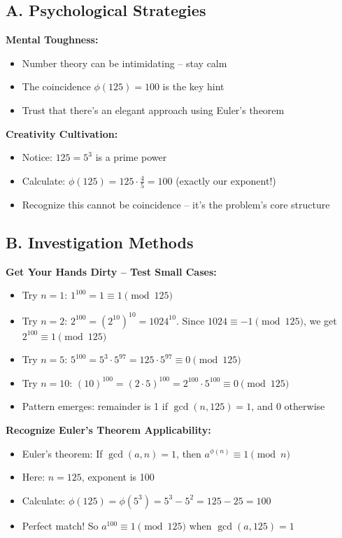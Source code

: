 \documentclass[12pt]{article}
\begin{document}
\begin{strategicbox}
\subsection*{A. Psychological Strategies}

\textbf{Mental Toughness:}
\begin{itemize}
    \item Number theory can be intimidating -- stay calm
    \item The coincidence $\phi(125) = 100$ is the key hint
    \item Trust that there's an elegant approach using Euler's theorem
\end{itemize}

\textbf{Creativity Cultivation:}
\begin{itemize}
    \item Notice: $125 = 5^3$ is a prime power
    \item Calculate: $\phi(125) = 125 \cdot \frac{4}{5} = 100$ (exactly our exponent!)
    \item Recognize this cannot be coincidence -- it's the problem's core structure
\end{itemize}

\subsection*{B. Investigation Methods}

\textbf{Get Your Hands Dirty -- Test Small Cases:}
\begin{itemize}
    \item Try $n = 1$: $1^{100} = 1 \equiv 1 \pmod{125}$
    \item Try $n = 2$: $2^{100} = (2^{10})^{10} = 1024^{10}$. Since $1024 \equiv -1 \pmod{125}$, we get $2^{100} \equiv 1 \pmod{125}$
    \item Try $n = 5$: $5^{100} = 5^3 \cdot 5^{97} = 125 \cdot 5^{97} \equiv 0 \pmod{125}$
    \item Try $n = 10$: $(10)^{100} = (2 \cdot 5)^{100} = 2^{100} \cdot 5^{100} \equiv 0 \pmod{125}$
    \item Pattern emerges: remainder is 1 if $\gcd(n, 125) = 1$, and 0 otherwise
\end{itemize}

\textbf{Recognize Euler's Theorem Applicability:}
\begin{itemize}
    \item Euler's theorem: If $\gcd(a, n) = 1$, then $a^{\phi(n)} \equiv 1 \pmod{n}$
    \item Here: $n = 125$, exponent is 100
    \item Calculate: $\phi(125) = \phi(5^3) = 5^3 - 5^2 = 125 - 25 = 100$
    \item Perfect match! So $a^{100} \equiv 1 \pmod{125}$ when $\gcd(a, 125) = 1$
\end{itemize}


\end{strategicbox}
\end{document}
